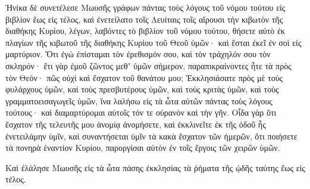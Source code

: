 {\par }{\PP {}Ἡνίκα δὲ συνετέλεσε Μωυσῆς γράφων πάντας τοὺς λόγους τοῦ νόμου τούτου εἰς βιβλίον ἕως εἰς τέλος,
καὶ ἐνετείλατο τοῖς Λευίταις τοῖς αἴρουσι τὴν κιβωτὸν τῆς διαθήκης Κυρίου, λέγων,
λαβόντες τὸ βιβλίον τοῦ νόμου τούτου, θήσετε αὐτὸ ἐκ πλαγίων τῆς κιβωτοῦ τῆς διαθήκης Κυρίου τοῦ Θεοῦ ὑμῶν· καὶ ἔσται ἐκεῖ ἐν σοὶ εἰς μαρτύριον.
Ὅτι ἐγὼ ἐπίσταμαι τὸν ἐρεθισμόν σου, καὶ τὸν τράχηλόν σου τὸν σκληρόν· ἔτι γὰρ ἐμοῦ ζῶντος μεθʼ ὑμῶν σήμερον, παραπικραίνοντες ἦτε τὰ πρὸς τὸν Θεόν· πῶς οὐχὶ καὶ ἔσχατον τοῦ θανάτου μου;
Ἐκκλησιάσατε πρὸς μὲ τοὺς φυλάρχους ὑμῶν, καὶ τοὺς πρεσβυτέρους ὑμῶν, καὶ τοὺς κριτὰς ὑμῶν, καὶ τοὺς γραμματοεισαγωγεῖς ὑμῶν, ἵνα λαλήσω εἰς τὰ ὦτα αὐτῶν πάντας τοὺς λόγους τούτους· καὶ διαμαρτύρομαι αὐτοῖς τόν τε οὐρανὸν καὶ τὴν γῆν.
Οἶδα γὰρ ὅτι ἔσχατον τῆς τελευτῆς μου ἀνομίᾳ ἀνομήσετε, καὶ ἐκκλινεῖτε ἐκ τῆς ὁδοῦ ἧς ἐνετειλάμην ὑμῖν, καὶ συναντήσεται ὑμῖν τὰ κακὰ ἔσχατον τῶν ἡμερῶν, ὅτι ποιήσετε τὰ πονηρὰ ἐναντίον Κυρίου, παροργίσαι αὐτὸν ἐν τοῖς ἔργοις τῶν χειρῶν ὑμῶν.
\par }{\PP {}Καὶ ἐλάλησε Μωυσῆς εἰς τὰ ὦτα πάσης ἐκκλησίας τὰ ῥήματα τῆς ᾠδῆς ταύτης ἕως εἰς τέλος.

}
